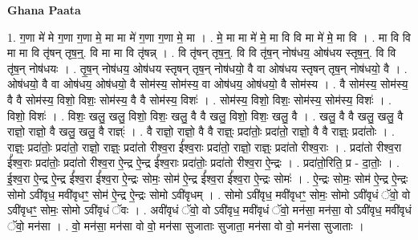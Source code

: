 \documentclass[17pt]{extarticle}
\begin{document}
\textbf{Ghana Paata } \newline

1. ग॒णा मे॑ मे ग॒णा ग॒णा मे॒ मा मा मे॑ ग॒णा ग॒णा मे॒ मा । . मे॒ मा मा मे॑ मे॒ मा वि वि मा मे॑ मे॒ मा वि । . मा वि वि मा मा वि तृ॑षन् तृष॒न्॒. वि मा मा वि तृ॑षन्न् । . वि तृ॑षन् तृष॒न्॒. वि वि तृ॑ष॒न् नोष॑धय॒ ओष॑धय स्तृष॒न्॒. वि वि तृ॑ष॒न् नोष॑धयः । . तृ॒ष॒न् नोष॑धय॒ ओष॑धय स्तृषन् तृष॒न् नोष॑धयो॒ वै वा ओष॑धय स्तृषन् तृष॒न् नोष॑धयो॒ वै । . ओष॑धयो॒ वै वा ओष॑धय॒ ओष॑धयो॒ वै सोम॑स्य॒ सोम॑स्य॒ वा ओष॑धय॒ ओष॑धयो॒ वै सोम॑स्य । . वै सोम॑स्य॒ सोम॑स्य॒ वै वै सोम॑स्य॒ विशो॒ विशः॒ सोम॑स्य॒ वै वै सोम॑स्य॒ विशः॑ । . सोम॑स्य॒ विशो॒ विशः॒ सोम॑स्य॒ सोम॑स्य॒ विशः॑ । . विशो॒ विशः॑ । . विशः॒ खलु॒ खलु॒ विशो॒ विशः॒ खलु॒ वै वै खलु॒ विशो॒ विशः॒ खलु॒ वै । . खलु॒ वै वै खलु॒ खलु॒ वै राज्ञो॒ राज्ञो॒ वै खलु॒ खलु॒ वै राज्ञ्ः॑ । . वै राज्ञो॒ राज्ञो॒ वै वै राज्ञ्ः॒ प्रदा॑तोः॒ प्रदा॑तो॒ राज्ञो॒ वै वै राज्ञ्ः॒ प्रदा॑तोः । . राज्ञ्ः॒ प्रदा॑तोः॒ प्रदा॑तो॒ राज्ञो॒ राज्ञ्ः॒ प्रदा॑तो रीश्व॒रा ई᳚श्व॒राः प्रदा॑तो॒ राज्ञो॒ राज्ञ्ः॒ प्रदा॑तो रीश्व॒राः । . प्रदा॑तो रीश्व॒रा ई᳚श्व॒राः प्रदा॑तोः॒ प्रदा॑तो रीश्व॒रा ऐ॒न्द्र ऐ॒न्द्र ई᳚श्व॒राः प्रदा॑तोः॒ प्रदा॑तो रीश्व॒रा ऐ॒न्द्रः । . प्रदा॑तो॒रिति॒ प्र - दा॒तोः॒ । . ई॒श्व॒रा ऐ॒न्द्र ऐ॒न्द्र ई᳚श्व॒रा ई᳚श्व॒रा ऐ॒न्द्रः सोमः॒ सोम॑ ऐ॒न्द्र ई᳚श्व॒रा ई᳚श्व॒रा ऐ॒न्द्रः सोमः॑ । . ऐ॒न्द्रः सोमः॒ सोम॑ ऐ॒न्द्र ऐ॒न्द्रः सोमो ऽवी॑वृध॒ मवी॑वृधꣳ॒॒ सोम॑ ऐ॒न्द्र ऐ॒न्द्रः सोमो ऽवी॑वृधम् । . सोमो ऽवी॑वृध॒ मवी॑वृधꣳ॒॒ सोमः॒ सोमो ऽवी॑वृधं ॅवो॒ वो ऽवी॑वृधꣳ॒॒ सोमः॒ सोमो ऽवी॑वृधं ॅवः । . अवी॑वृधं ॅवो॒ वो ऽवी॑वृध॒ मवी॑वृधं ॅवो॒ मन॑सा॒ मन॑सा॒ वो ऽवी॑वृध॒ मवी॑वृधं ॅवो॒ मन॑सा । . वो॒ मन॑सा॒ मन॑सा वो वो॒ मन॑सा सुजाताः सुजाता॒ मन॑सा वो वो॒ मन॑सा सुजाताः । \newline
\end{document}

